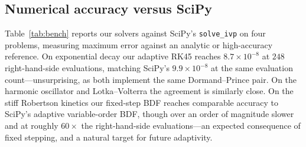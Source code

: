 \documentclass[sigplan,nonacm,screen,review]{acmart}
\begin{document}
\subsection{Numerical accuracy versus SciPy}
Table~\ref{tab:bench} reports our solvers against SciPy's
\texttt{solve\_ivp} on four problems, measuring maximum error
against an analytic or high-accuracy reference. On exponential decay our adaptive
RK45 reaches $8.7\times10^{-8}$ at $248$ right-hand-side evaluations, matching
SciPy's $9.9\times10^{-8}$ at the same evaluation count---unsurprising, as both
implement the same Dormand--Prince pair. On the harmonic oscillator and
Lotka--Volterra the agreement is similarly close. On the stiff Robertson kinetics
our fixed-step BDF reaches comparable accuracy to SciPy's adaptive
variable-order BDF, though over an order of magnitude slower and at roughly
$60\times$ the right-hand-side evaluations---an expected consequence of fixed
stepping, and a natural target for future adaptivity.

\begin{table}[t]
\caption{Maximum error, wall-clock time, and right-hand-side evaluations versus
SciPy. ``ours'' denotes the verisolv solver; time is the minimum over repeated
runs. Lower is better throughout.}
\label{tab:bench}
\small
{}
\end{table}
\end{document}
